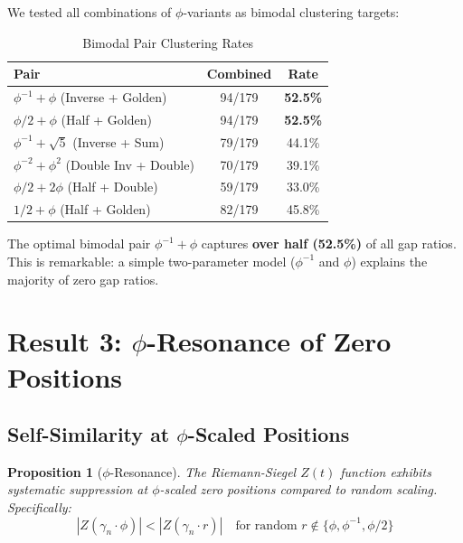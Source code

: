 \documentclass[11pt,a4paper]{article}
\newtheorem{proposition}[theorem]{Proposition}
\begin{document}
We tested all combinations of $\phi$-variants as bimodal clustering targets:

\begin{table}[H]
\centering
\caption{Bimodal Pair Clustering Rates}
\label{tab:bimodal_full}
\begin{tabular}{@{}lcc@{}}
\toprule
\textbf{Pair} & \textbf{Combined} & \textbf{Rate} \\
\midrule
$\phi^{-1} + \phi$ (Inverse + Golden) & 94/179 & \textbf{52.5\%} \\
$\phi/2 + \phi$ (Half + Golden) & 94/179 & \textbf{52.5\%} \\
$\phi^{-1} + \sqrt{5}$ (Inverse + Sum) & 79/179 & 44.1\% \\
$\phi^{-2} + \phi^2$ (Double Inv + Double) & 70/179 & 39.1\% \\
$\phi/2 + 2\phi$ (Half + Double) & 59/179 & 33.0\% \\
$1/2 + \phi$ (Half + Golden) & 82/179 & 45.8\% \\
\bottomrule
\end{tabular}
\end{table}

The optimal bimodal pair $\phi^{-1} + \phi$ captures \textbf{over half (52.5\%)} of all gap ratios. This is remarkable: a simple two-parameter model ($\phi^{-1}$ and $\phi$) explains the majority of zero gap ratios.

\newpage

\section{Result 3: $\phi$-Resonance of Zero Positions}
\label{sec:resonance}

\subsection{Self-Similarity at $\phi$-Scaled Positions}

\begin{proposition}[$\phi$-Resonance]
\label{prop:resonance}
The Riemann-Siegel $Z(t)$ function exhibits systematic suppression at $\phi$-scaled zero positions compared to random scaling. Specifically:
\begin{equation}
|Z(\gamma_n \cdot \phi)| < |Z(\gamma_n \cdot r)| \quad \text{for random } r \notin \{\phi, \phi^{-1}, \phi/2\}
\end{equation}
\end{proposition}
\end{document}
